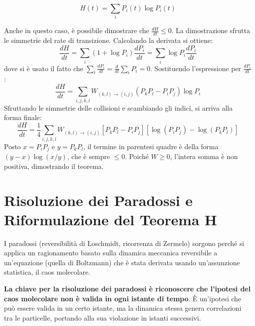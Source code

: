 \begin{equation}
H(t) = \sum_i P_i(t) \log P_i(t)
\end{equation}

Anche in questo caso, è possibile dimostrare che $\frac{dH}{dt} \le 0$. La dimostrazione sfrutta le simmetrie del rate di transizione. Calcolando la derivata si ottiene:
\begin{equation}
\frac{dH}{dt} = \sum_i (1 + \log P_i) \frac{dP_i}{dt} = \sum_i \log P_i \frac{dP_i}{dt}
\end{equation}
dove si è usato il fatto che $\sum_i \frac{dP_i}{dt} = \frac{d}{dt} \sum_i P_i = 0$. Sostituendo l'espressione per $\frac{dP_i}{dt}$:
\begin{equation}
\frac{dH}{dt} = \sum_{i,j,k,l} W_{(k,l)\to(i,j)} (P_k P_l - P_i P_j) \log P_i
\end{equation}
Sfruttando le simmetrie delle collisioni e scambiando gli indici, si arriva alla forma finale:
\begin{equation}
\frac{dH}{dt} = \frac{1}{4} \sum_{i,j,k,l} W_{(k,l)\to(i,j)} [P_k P_l - P_i P_j] [\log(P_i P_j) - \log(P_k P_l)]
\end{equation}
Posto $x = P_i P_j$ e $y = P_k P_l$, il termine in parentesi quadre è della forma $(y-x) \log(x/y)$, che è sempre $\le 0$. Poiché $W \ge 0$, l'intera somma è non positiva, dimostrando il teorema.

\section{Risoluzione dei Paradossi e Riformulazione del Teorema H}

I paradossi (reversibilità di Loschmidt, ricorrenza di Zermelo) sorgono perché si applica un ragionamento basato sulla dinamica meccanica reversibile a un'equazione (quella di Boltzmann) che è stata derivata usando un'assunzione statistica, il caos molecolare.

\textbf{La chiave per la risoluzione dei paradossi è riconoscere che l'ipotesi del caos molecolare non è valida in ogni istante di tempo}. È un'ipotesi che può essere valida in un certo istante, ma la dinamica stessa genera correlazioni tra le particelle, portando alla sua violazione in istanti successivi.

